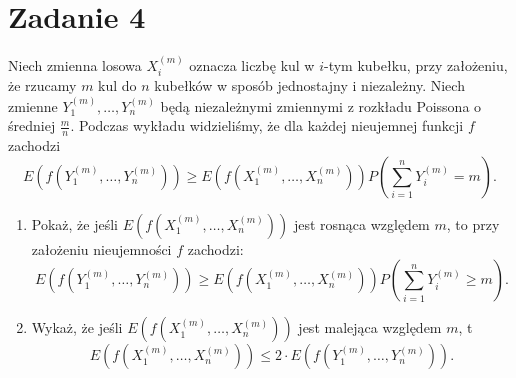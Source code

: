 \section{Zadanie 4}
Niech zmienna losowa \(X_{i}^{(m)}\) oznacza liczbę kul w \(i\)-tym kubełku, przy założeniu, że rzucamy
\(m\) kul do \(n\) kubełków w sposób jednostajny i niezależny. Niech zmienne \(Y_{1}^{(m)},\dots,Y_{n}^{(m)}\)
będą niezależnymi zmiennymi z rozkładu Poissona o średniej \(\frac{m}{n}\). Podczas wykładu widzieliśmy,
że dla każdej nieujemnej funkcji \(f\) zachodzi
\[E\left(f\left(Y_{1}^{(m)},\dots,Y_{n}^{(m)}\right)\right) \geqslant E\left(f\left(X_{1}^{(m)},\dots,X_{n}^{(m)}\right)\right)P\left(\sum_{i=1}^{n}Y_{i}^{(m)}=m\right).\]
\begin{enumerate}[label=(\roman*)]
	\item Pokaż, że jeśli \(E(f(X_{1}^{(m)},\dots,X_{n}^{(m)}))\) jest rosnąca względem \(m\), to przy założeniu nieujemności \(f\) zachodzi:
	      \[E\left(f\left(Y_{1}^{(m)},\dots,Y_{n}^{(m)}\right)\right) \geqslant E\left(f\left(X_{1}^{(m)},\dots,X_{n}^{(m)}\right)\right)P\left(\sum_{i=1}^{n}Y_{i}^{(m)}\geqslant m\right).\]
	\item Wykaż, że jeśli \(E(f(X_{1}^{(m)},\dots,X_{n}^{(m)}))\) jest malejąca względem \(m\), t
	      \[E\left(f\left(X_{1}^{(m)},\dots,X_{n}^{(m)}\right)\right) \leqslant 2\cdot E\left(f\left(Y_{1}^{(m)},\dots,Y_{n}^{(m)}\right)\right).\]
\end{enumerate}
